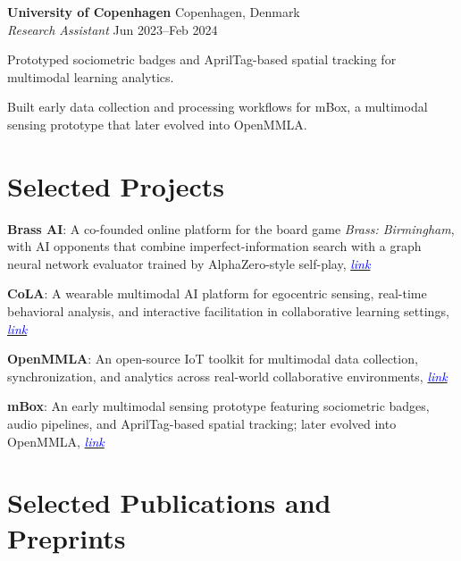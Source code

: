 \documentclass[11pt,letterpaper]{report}
\newcommand{\listitemspace}{0.25em}
\renewenvironment{itemize}
{\begin{list}{}{\setlength{\leftmargin}{0em}
                \setlength{\parskip}{0em}
                \setlength{\itemsep}{\listitemspace}
                \setlength{\parsep}{\listitemspace}}}
{\end{list}}
\begin{document}
    \noindent \textbf{University of Copenhagen} \hfill Copenhagen, Denmark \\
    \textit{Research Assistant} \hfill Jun 2023--Feb 2024
    \begin{list}{\textbullet}{\setlength{\leftmargin}{1.2em}}
        \item Prototyped sociometric badges and AprilTag-based spatial tracking for multimodal learning analytics.
        \item Built early data collection and processing workflows for mBox, a multimodal sensing prototype that later evolved into OpenMMLA.
    \end{list}


    \section*{Selected Projects}

    \begin{itemize}
    
        \item \textbf{Brass AI}: A co-founded online platform for the board game \textit{Brass: Birmingham}, with AI opponents that combine imperfect-information search with a graph neural network evaluator trained by AlphaZero-style self-play, \href{https://brass.ucph-cola.org}{\textcolor{blue}{\textit{link}}}
        \item \textbf{CoLA}: A wearable multimodal AI platform for egocentric sensing, real-time behavioral analysis, and interactive facilitation in collaborative learning settings, \href{https://ucph-cola.org}{\textcolor{blue}{\textit{link}}}
        \item \textbf{OpenMMLA}: An open-source IoT toolkit for multimodal data collection, synchronization, and analytics across real-world collaborative environments, \href{https://github.com/ucph-ccs/OpenMMLA}{\textcolor{blue}{\textit{link}}}
        \item \textbf{mBox}: An early multimodal sensing prototype featuring sociometric badges, audio pipelines, and AprilTag-based spatial tracking; later evolved into OpenMMLA, \href{https://github.com/ucph-ccs/mbox-uber}{\textcolor{blue}{\textit{link}}}

    \end{itemize}


    \section*{Selected Publications and Preprints}
\end{document}
